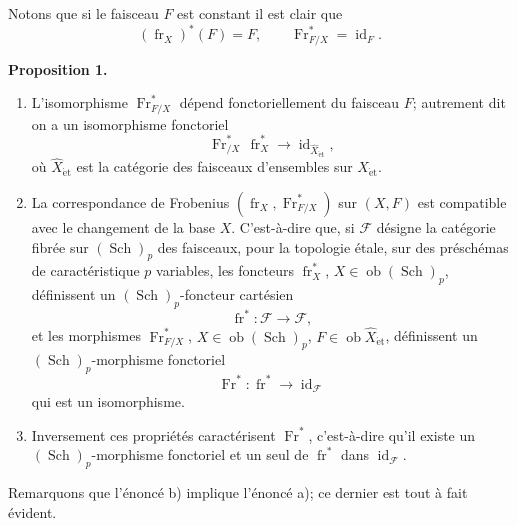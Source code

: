 \documentclass[11pt]{article}
\newenvironment{statement}[1]{\par\medskip\noindent\textbf{#1.}\ }{\par\medskip}
\providecommand{\et}{\mathrm{\acute{e}t}}
\providecommand{\id}{\operatorname{id}}
\providecommand{\Ob}{\operatorname{ob}}
\providecommand{\id}{\operatorname{id}}
\providecommand{\id}{\operatorname{id}}
\providecommand{\Ob}{\operatorname{ob}}
\providecommand{\id}{\operatorname{id}}
\providecommand{\id}{\operatorname{id}}
\providecommand{\Ob}{\operatorname{Ob}}
\providecommand{\Ob}{\operatorname{ob}}
\providecommand{\fr}{\operatorname{fr}}
\providecommand{\Fr}{\operatorname{Fr}}
\providecommand{\Sch}{\operatorname{Sch}}
\providecommand{\Fr}{\operatorname{Fr}}
\providecommand{\fr}{\operatorname{fr}}
\providecommand{\Sch}{\operatorname{Sch}}
\providecommand{\id}{\operatorname{id}}
\providecommand{\Ob}{\operatorname{Ob}}
\providecommand{\et}{\acute{e}t}
\begin{document}
Notons que si le faisceau $F$ est constant il est clair que
\[
(\fr_X)^*(F)=F,
\qquad
\Fr^*_{F/X}=\id_F.
\]

\begin{statement}{Proposition 1}
\begin{enumerate}[label=\alph*)]
\item L'isomorphisme $\Fr^*_{F/X}$ dépend fonctoriellement du faisceau $F$; autrement dit on a un isomorphisme fonctoriel
\[
\Fr^*_{/X}\,\fr_X^*\longrightarrow \id_{\widehat X_{\et}},
\]
où $\widehat X_{\et}$ est la catégorie des faisceaux d'ensembles sur $X_{\et}$.
\item La correspondance de Frobenius $(\fr_X,\Fr^*_{F/X})$ sur $(X,F)$ est compatible avec le changement de la base $X$. C'est-à-dire que, si $\mathcal F$ désigne la catégorie fibrée sur $(\Sch)_p$ des faisceaux, pour la topologie étale, sur des préschémas de caractéristique $p$ variables, les foncteurs $\fr_X^*$, $X\in\Ob(\Sch)_p$, définissent un $(\Sch)_p$-foncteur cartésien
\[
\fr^*: \mathcal F\longrightarrow\mathcal F,
\]
et les morphismes $\Fr^*_{F/X}$, $X\in\Ob(\Sch)_p$, $F\in\Ob\widehat X_{\et}$, définissent un $(\Sch)_p$-morphisme fonctoriel
\[
\Fr^*:\fr^*\longrightarrow\id_{\mathcal F}
\]
qui est un isomorphisme.
\item Inversement ces propriétés caractérisent $\Fr^*$, c'est-à-dire qu'il existe un $(\Sch)_p$-morphisme fonctoriel et un seul de $\fr^*$ dans $\id_{\mathcal F}$.
\end{enumerate}
\end{statement}

Remarquons que l'énoncé b) implique l'énoncé a); ce dernier est tout à fait évident.
\end{document}
